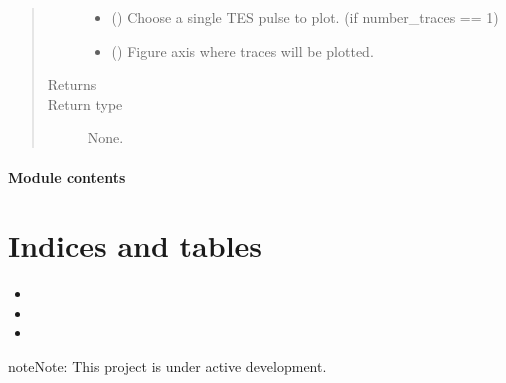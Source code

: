 \documentclass[letterpaper,10pt,english]{sphinxmanual}
\begin{document}
\begin{fulllineitems}
\begin{quote}
\begin{description}
\begin{itemize}
\item {} 
\sphinxAtStartPar
{} () \textendash{} Choose a single TES pulse to plot.
(if number\_traces == 1)

\item {} 
\sphinxAtStartPar
{} () \textendash{} Figure axis where traces will be plotted.

\end{itemize}

\item[{Returns}] \leavevmode
\sphinxAtStartPar


\item[{Return type}] \leavevmode
\sphinxAtStartPar
None.

\end{description}\end{quote}

\end{fulllineitems}



\subsubsection{Module contents}
\label{\detokenize{tes:module-tes}}\label{\detokenize{tes:module-contents}}

\chapter{Indices and tables}
\label{\detokenize{index:indices-and-tables}}\begin{itemize}
\item {} 
\sphinxAtStartPar
{}

\item {} 
\sphinxAtStartPar
{}

\item {} 
\sphinxAtStartPar
{}

\end{itemize}

\begin{sphinxadmonition}{note}{Note:}
\sphinxAtStartPar
This project is under active development.
\end{sphinxadmonition}
\end{document}
